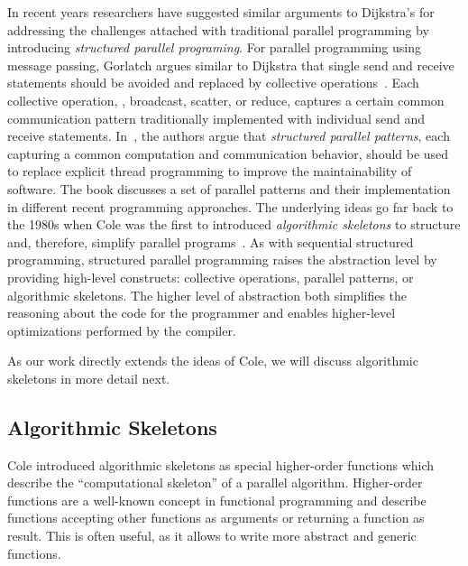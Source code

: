 In recent years researchers have suggested similar arguments to Dijkstra's for addressing the challenges attached with traditional parallel programming by introducing \emph{structured parallel programing}.
For parallel programming using message passing, Gorlatch argues similar to Dijkstra that single send and receive statements should be avoided and replaced by collective operations~\cite{Gorlatch04}.
Each collective operation, \eg, broadcast, scatter, or reduce, captures a certain common communication pattern traditionally implemented with individual send and receive statements.
In~\cite{McCoolRoRe2012}, the authors argue that \emph{structured parallel patterns}, each capturing a common computation and communication behavior, should be used to replace explicit thread programming to improve the maintainability of software.
The book discusses a set of parallel patterns and their implementation in different recent programming approaches.
The underlying ideas go far back to the 1980s when Cole was the first to introduced \emph{algorithmic skeletons} to structure and, therefore, simplify parallel programs~\cite{Cole1991}.
As with sequential structured programming, structured parallel programming raises the abstraction level by providing high-level constructs: collective operations, parallel patterns, or algorithmic skeletons.
The higher level of abstraction both simplifies the reasoning about the code for the programmer and enables higher-level optimizations performed by the compiler.

As our work directly extends the ideas of Cole, we will discuss algorithmic skeletons in more detail next.

\subsection{Algorithmic Skeletons}
Cole introduced algorithmic skeletons as special higher-order functions which describe the ``computational skeleton'' of a parallel algorithm.
Higher-order functions are a well-known concept in functional programming and describe functions accepting other functions as arguments or returning a function as result.
This is often useful, as it allows to write more abstract and generic functions.

